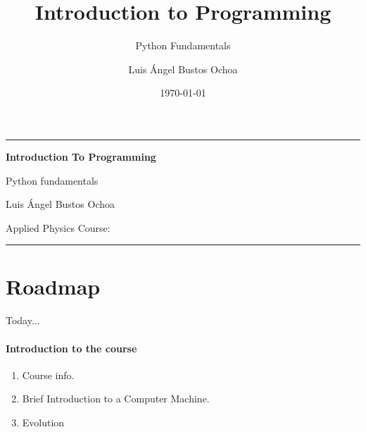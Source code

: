 \documentclass[aspectratio=169,11pt,english]{beamer}
\title[CLASS 1.]{Introduction to Programming}
\subtitle{Python Fundamentals}
\author[ ]{Luis Ángel Bustos Ochoa}
\institute{Applied Physics}
\date{\today}
\begin{document}
	
{
	\begin{frame}[plain]
		\centering
		\vspace{0.7cm}
		
		{\color{PythonYellow}\rule{0.22\textwidth}{2pt}}
		
		\vspace{0.65cm}
		
		{\color{white}\Huge\bfseries Introduction To Programming\par}
		
		\vspace{0.35cm}
		
		{\color{PythonYellow}\Large Python fundamentals\par}
		
		\vspace{0.8cm}
		
		
		\vfill
		
		{\color{white}\large Luis Ángel Bustos Ochoa\par}
		\vspace{0.15cm}
		{\color{white!75}\normalsize Applied Physics \textbar{} Course: \par}
		
		\vspace{0.55cm}
		{\color{PythonYellow}\rule{0.22\textwidth}{2pt}}
		
		\vspace{0.35cm}
		{\color{white!70}\small\insertdate\par}
	\end{frame}
}	
	\section{Roadmap}
	
	\begin{frame}{Today...}
		\framesubtitle{Introduction to the course}
		
		{\large
			\begin{enumerate}
				\item Course info.
				\item Brief Introduction to a Computer Machine.
				\item Evolution
			\end{enumerate}
		}
	\end{frame}
	
\end{document}
